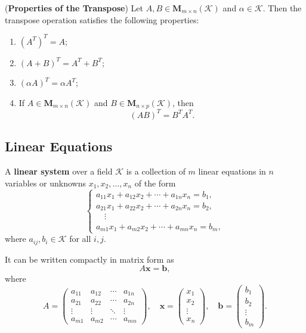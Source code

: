 \documentclass{ctexart}
\begin{document}
	\begin{mythm}
		(\textbf{Properties of the Transpose})  
		Let $A, B \in \mathbf{M}_{m \times n}(\mathcal{K})$ and $\alpha \in \mathcal{K}$.  
		Then the transpose operation satisfies the following properties:
		\begin{enumerate}
			\item $(A^{T})^{T} = A$;
			\item $(A + B)^{T} = A^{T} + B^{T}$;
			\item $(\alpha A)^{T} = \alpha A^{T}$;
			\item If $A \in \mathbf{M}_{m \times n}(\mathcal{K})$ and 
			$B \in \mathbf{M}_{n \times p}(\mathcal{K})$, then
			\[
			(AB)^{T} = B^{T}A^{T}.
			\]
		\end{enumerate}
	\end{mythm}
	
	
	\subsection{Linear Equations}
	\begin{mydef}
		A \textbf{linear system} over a field $\mathcal{K}$ is a collection of $m$ linear equations in $n$ variables or unknowns 
		$x_1, x_2, \dots, x_n$ of the form
		\[
		\begin{cases}
			a_{11}x_1 + a_{12}x_2 + \cdots + a_{1n}x_n = b_1,\\
			a_{21}x_1 + a_{22}x_2 + \cdots + a_{2n}x_n = b_2,\\
			\quad \vdots\\
			a_{m1}x_1 + a_{m2}x_2 + \cdots + a_{mn}x_n = b_m,
		\end{cases}
		\]
		where $a_{ij}, b_i \in \mathcal{K}$ for all $i,j$.  
		
		It can be written compactly in matrix form as
		\[
		A\mathbf{x} = \mathbf{b},
		\]
		where
		\[
		A = 
		\begin{pmatrix}
			a_{11} & a_{12} & \cdots & a_{1n} \\
			a_{21} & a_{22} & \cdots & a_{2n} \\
			\vdots & \vdots & \ddots & \vdots \\
			a_{m1} & a_{m2} & \cdots & a_{mn}
		\end{pmatrix},
		\quad
		\mathbf{x} =
		\begin{pmatrix}
			x_1 \\ x_2 \\ \vdots \\ x_n
		\end{pmatrix},
		\quad
		\mathbf{b} =
		\begin{pmatrix}
			b_1 \\ b_2 \\ \vdots \\ b_m
		\end{pmatrix}.
		\]
	\end{mydef}
	
\end{document}
